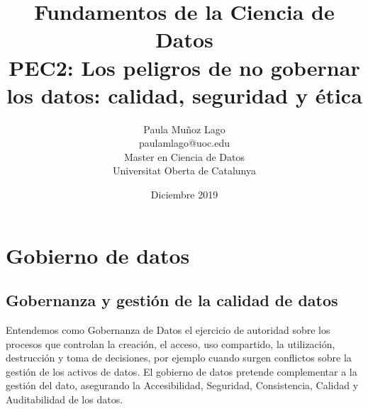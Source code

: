 \documentclass{article}
\title{Fundamentos de la Ciencia de Datos \\ PEC2: Los peligros de no gobernar los datos: calidad, seguridad y ética}
\author{Paula Muñoz Lago \\ paulamlago@uoc.edu \\ Master en Ciencia de Datos \\ Universitat Oberta de Catalunya}
\date{Diciembre 2019}
\begin{document}
\maketitle

\section{Gobierno de datos}

\subsection{Gobernanza y gestión de la calidad de datos}

Entendemos como Gobernanza de Datos el ejercicio de autoridad sobre los procesos que controlan la creación, el acceso, uso compartido, la utilización, destrucción y toma de decisiones, por ejemplo cuando surgen conflictos sobre la gestión de los activos de datos. El gobierno de datos pretende complementar a la gestión del dato, asegurando la Accesibilidad, Seguridad, Consistencia, Calidad y Auditabilidad de los datos.


\end{document}
